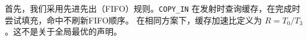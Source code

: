 首先，我们采用先进先出（FIFO）规则。\texttt{COPY\_IN} 在发射时查询缓存，在完成时尝试填充，命中不刷新FIFO顺序。\cite{problemA}
在相同方案下，缓存加速比定义为 $R=T_0/T_3$。这不是关于全局最优的声明。
